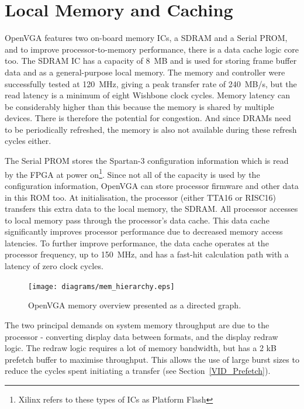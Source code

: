 \chapter{Local Memory and Caching}
\label{MEM}

OpenVGA features two on-board memory ICs, a SDRAM and a Serial PROM, and to
improve processor-to-memory performance, there is a data cache logic core too.
The SDRAM IC has a capacity of 8~MB and is used for storing frame buffer data and
as a general-purpose local memory. The memory and controller were successfully
tested at 120~MHz, giving a peak transfer rate of 240~MB/s, but the read latency
is a minimum of eight Wishbone clock cycles. Memory latency can be considerably
higher than this because the memory is shared by multiple devices. There is
therefore the potential for congestion. And since DRAMs need to be periodically
refreshed, the memory is also not available during these refresh cycles either.

The Serial PROM stores the Spartan-3 configuration information which is read by
the FPGA at power on\footnote{Xilinx refers to these types of ICs as Platform
Flash}. Since not all of the capacity is used by the configuration information,
OpenVGA can store processor firmware and other data in this ROM too. At
initialisation, the processor (either TTA16 or RISC16) transfers this extra data
to the local memory, the SDRAM. All processor accesses to local memory pass
through the processor's data cache. This data cache significantly improves
processor performance due to decreased memory access latencies. To further
improve performance, the data cache operates at the processor frequency, up to
150~MHz, and has a fast-hit calculation path with a latency of zero clock cycles.

\begin{figure}[h!]
\begin{center}
\texttt{[image: diagrams/mem\_hierarchy.eps]}
\caption[OpenVGA memory hierarchy]{OpenVGA memory overview presented as a
directed graph.}
\end{center}
\end{figure}

The two principal demands on system memory throughput are due to the processor -
converting display data between formats, and the display redraw logic. The redraw
logic requires a lot of memory bandwidth, but has a 2 kB prefetch buffer to
maximise throughput. This allows the use of large burst sizes to reduce the
cycles spent initiating a transfer (see Section~\ref{VID_Prefetch}).


